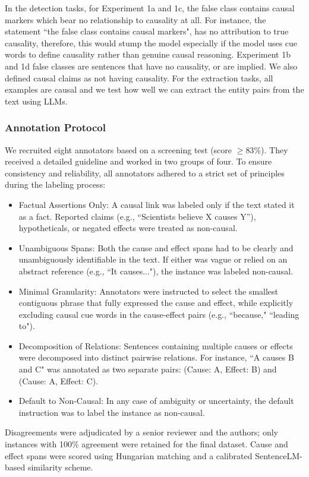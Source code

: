 \documentclass[conference]{IEEEtran}
\begin{document}
In the detection tasks, for Experiment 1a and 1c, the false class contains causal markers which bear no relationship to causality at all. For instance, the statement ``the false class contains causal markers", has no attribution to true causality, therefore, this would stump the model especially if the model uses cue words to define causality rather than genuine causal reasoning. Experiment 1b and 1d false classes are sentences that have no causality, or are implied. We also defined causal claims as not having causality. For the extraction tasks, all examples are causal and we test how well we can extract the entity pairs from the text using LLMs. 


\subsubsection{Annotation Protocol}

We recruited eight annotators based on a screening test (score $\ge83\%$). They received a detailed guideline and worked in two groups of four. To ensure consistency and reliability, all annotators adhered to a strict set of principles during the labeling process:
\begin{itemize}[leftmargin=*]
\item {Factual Assertions Only:} A causal link was labeled only if the text stated it as a fact. Reported claims (e.g., ``Scientists believe X causes Y''), hypotheticals, or negated effects were treated as non-causal.
\item {Unambiguous Spans:} Both the cause and effect spans had to be clearly and unambiguously identifiable in the text. If either was vague or relied on an abstract reference (e.g., ``It causes..."), the instance was labeled non-causal.
\item {Minimal Granularity:} Annotators were instructed to select the smallest contiguous phrase that fully expressed the cause and effect, while explicitly excluding causal cue words in the cause-effect pairs (e.g., ``because," ``leading to").
\item {Decomposition of Relations:} Sentences containing multiple causes or effects were decomposed into distinct pairwise relations. For instance, ``A causes B and C" was annotated as two separate pairs: (Cause: A, Effect: B) and (Cause: A, Effect: C).
\item {Default to Non-Causal:} In any case of ambiguity or uncertainty, the default instruction was to label the instance as non-causal.
\end{itemize}
Disagreements were adjudicated by a senior reviewer and the authors; only instances with 100\% agreement were retained for the final dataset. Cause and effect spans were scored using Hungarian matching and a calibrated SentenceLM-based similarity scheme.
\end{document}
